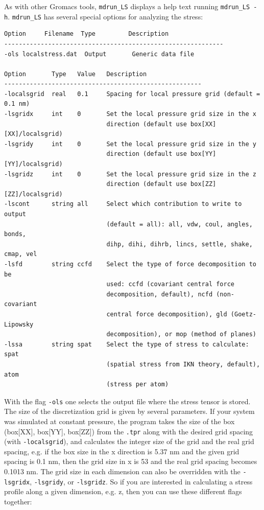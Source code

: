 \documentclass[10pt,letterpaper,notitlepage]{article}
\begin{document}
As with other Gromacs tools, \texttt{mdrun\_LS} displays a help text running \texttt{mdrun\_LS -h}. \texttt{mdrun\_LS} has several special options for analyzing the stress:
\begin{lstlisting}[caption=\texttt{mdrun\_LS} special options]
Option     Filename  Type         Description
------------------------------------------------------------
-ols localstress.dat  Output       Generic data file

Option       Type   Value   Description
------------------------------------------------------
-localsgrid  real   0.1     Spacing for local pressure grid (default = 0.1 nm)
-lsgridx     int    0       Set the local pressure grid size in the x
                            direction (default use box[XX][XX]/localsgrid)
-lsgridy     int    0       Set the local pressure grid size in the y
                            direction (default use box[YY][YY]/localsgrid)
-lsgridz     int    0       Set the local pressure grid size in the z
                            direction (default use box[ZZ][ZZ]/localsgrid)
-lscont      string all     Select which contribution to write to output
                            (default = all): all, vdw, coul, angles, bonds,
                            dihp, dihi, dihrb, lincs, settle, shake, cmap, vel
-lsfd        string ccfd    Select the type of force decomposition to be
                            used: ccfd (covariant central force
                            decomposition, default), ncfd (non-covariant
                            central force decomposition), gld (Goetz-Lipowsky
                            decomposition), or mop (method of planes)
-lssa        string spat    Select the type of stress to calculate: spat
                            (spatial stress from IKN theory, default), atom
                            (stress per atom)

\end{lstlisting}
With the flag \texttt{-ols} one selects the output file where the stress tensor is stored. The size of the discretization grid is given by several parameters. If your system was simulated at constant pressure, the program takes the size of the box (box[XX], box[YY], box[ZZ]) from the \texttt{.tpr} along with the desired grid spacing (with \texttt{-localsgrid}), and calculates the integer size of the grid and the real grid spacing, e.g. if the box size in the x direction is 5.37 nm and the given grid spacing is 0.1 nm, then the grid size in x is 53 and the real grid spacing becomes 0.1013 nm. The grid size in each dimension can also be overridden with the \texttt{-lsgridx}, \texttt{-lsgridy}, or \texttt{-lsgridz}. So if you are interested in calculating a stress profile along a given dimension, e.g. z, then you can use these different flags together:
\end{document}
